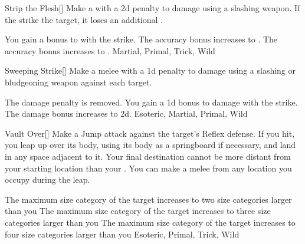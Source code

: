 \lowercase{\hypertarget{maneuver:Strip the Flesh}{}}\label{maneuver:Strip the Flesh}
\hypertarget{maneuver:Strip the Flesh}{}
\begin{freeability}[Rank 1]{Strip the Flesh}[]
Make a  with a \minus2d penalty to damage using a slashing weapon.
If the strike  the target, it loses an additional .

\rankline
{} You gain a  bonus to  with the strike.
 The accuracy bonus increases to .
 The accuracy bonus increases to .
 Martial, Primal, Trick, Wild
\end{freeability}
\vspace{0.25em}



\lowercase{\hypertarget{maneuver:Sweeping Strike}{}}\label{maneuver:Sweeping Strike}
\hypertarget{maneuver:Sweeping Strike}{}
\begin{freeability}[Rank 1]{Sweeping Strike}[]
Make a melee  with a \minus1d penalty to damage using a slashing or bludgeoning weapon against each target.

\rankline
{} The damage penalty is removed.
 You gain a \plus1d bonus to damage with the strike.
 The damage bonus increases to \plus2d.
 Esoteric, Martial, Primal, Wild
\end{freeability}
\vspace{0.25em}



\lowercase{\hypertarget{maneuver:Vault Over}{}}\label{maneuver:Vault Over}
\hypertarget{maneuver:Vault Over}{}
\begin{freeability}[Rank 1]{Vault Over}[]
Make a Jump attack against the target's Reflex defense.
If you hit, you leap up over its body, using its body as a springboard if necessary, and land in any space adjacent to it.
Your final destination cannot be more distant from your starting location than your .
You can make a melee  from any location you occupy during the leap.

\rankline
{} The maximum size category of the target increases to two size categories larger than you
 The maximum size category of the target increases to three size categories larger than you
 The maximum size category of the target increases to four size categories larger than you
 Esoteric, Primal, Trick, Wild
\end{freeability}
\vspace{0.25em}



